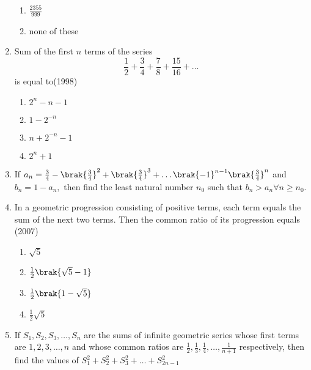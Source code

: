 \begin{enumerate}[label=\thesubsection.\arabic*,ref=\thesubsection.\theenumi]
\begin{multicols}{4}
\begin{enumerate}
        \item $\frac{2355}{999}$ 
        \item none of these 
    \end{enumerate}
\end{multicols}
    \item Sum of the first $ n$ terms of the series 
$$ \frac{1}{2}+ \frac{3}{4}+ \frac{7}{8}+ \frac{15}{16}+ \dots $$ is equal to\hfill (1998)
\begin{multicols}{4}
\begin{enumerate}    
    \item $2^n-n-1$  
    \item $1-2^{-n}$
    \item $n+2^{-n}-1$
    \item $2^n+1$
    \end{enumerate}
    \end{multicols}
%
	\item If $ a_n=\frac{3}{4}-\brak{\frac{3}{4}}^{2}+\brak{\frac{3}{4}}^{3}+\dots\brak{-1}^{n-1}\brak{\frac{3}{4}}^{n} $ and $ b_{n}=1-a_{n},  $ then find the least natural number $n_{0}$ such that $ b_{n} > a_{n} \forall n \geq n_{0}. $ 
%		             
		\hfill {}
    \item  In a geometric progression consisting of positive terms,  each term equals the sum of the next two terms. Then the common ratio of its progression equals   
    \hfill(2007)
%    
    \begin{multicols}{4}
\begin{enumerate}    
    \item$\sqrt{5}$
    \item$\frac{1}{2}\brak{\sqrt{5}-1}$
    \item$\frac{1}{2}\brak{1-\sqrt{5}}$
    \item$\frac{1}{2}\sqrt{5}$ 
    \end{enumerate}
\end{multicols}
      \item  If $ S_1, S_2, S_3, \dots, S_n $ are the sums of infinite geometric series whose first terms are $1, 2, 3, \dots, n$ and whose common ratios are $ \frac{1}{2}, \frac{1}{3}, \frac{1}{4}, \dots, \frac{1}{n+1} $ respectively,  then find the values of $ S_{1}^{2}+S_{2}^{2}+S_{3}^{2}+\dots+S_{2n-1}^{2} $
%      
	      \hfill {}
\end{enumerate}
